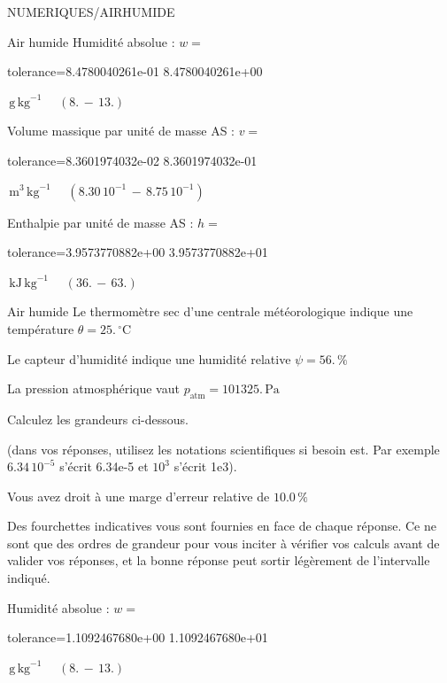 \documentclass[12pt]{article}
\begin{document}
\begin{quiz}{NUMERIQUES/AIRHUMIDE}
\begin{cloze}{Air humide}
Humidité absolue : $w =  $
\begin{numerical}[points=1] 
\item[tolerance={8.4780040261e-01}] 8.4780040261e+00 
\end{numerical} 
 $\,  \mathrm{g}\,  \mathrm{kg}^{-1}$ 
 $ \quad (8. \, - \, 13.) $ 

Volume massique par unité de masse AS : $v =  $
\begin{numerical}[points=1] 
\item[tolerance={8.3601974032e-02}] 8.3601974032e-01 
\end{numerical} 
 $\,  \mathrm{m}^{3}\,  \mathrm{kg}^{-1}$ 
 $ \quad ( 8.30 \, 10^{-1}  \, - \,  8.75 \, 10^{-1} ) $ 

Enthalpie par unité de masse AS : $h =  $
\begin{numerical}[points=2] 
\item[tolerance={3.9573770882e+00}] 3.9573770882e+01 
\end{numerical} 
 $\,  \mathrm{kJ}\,  \mathrm{kg}^{-1}$ 
 $ \quad (36. \, - \, 63.) $ 

\end{cloze} 


 \begin{cloze}{Air humide} 
Le thermomètre sec d’une centrale météorologique indique une température $\theta = 25.\,  \mathrm{^\circ\mathrm{C}} $

Le capteur d'humidité indique une humidité relative $\psi = 56.\, \% $

La pression atmosphérique vaut $p_{\text{atm}} = 101325.\,  \mathrm{Pa} $

 

Calculez les grandeurs ci-dessous.

(dans vos réponses, utilisez les notations scientifiques si besoin est. Par exemple $6.34\, 10^{-5}$ s'écrit 6.34e-5 et $10^{3}$ s'écrit 1e3).

Vous avez droit à une marge d'erreur relative de $10.0\, \% $

Des fourchettes indicatives vous sont fournies en face de chaque réponse. Ce ne sont que des ordres de grandeur pour vous inciter à vérifier vos calculs avant de valider vos réponses, et la bonne réponse peut sortir légèrement de l'intervalle indiqué.

Humidité absolue : $w =  $
\begin{numerical}[points=1] 
\item[tolerance={1.1092467680e+00}] 1.1092467680e+01 
\end{numerical} 
 $\,  \mathrm{g}\,  \mathrm{kg}^{-1}$ 
 $ \quad (8. \, - \, 13.) $ 


\end{cloze}
\end{quiz}
\end{document}
